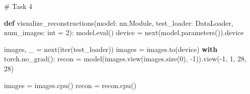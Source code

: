 \documentclass[
  letterpaper,
  DIV=11,
  numbers=noendperiod]{scrartcl}
\newenvironment{Shaded}{\begin{snugshade}}{\end{snugshade}}
\newcommand{\BuiltInTok}[1]{\textcolor[rgb]{0.00,0.23,0.31}{#1}}
\newcommand{\CommentTok}[1]{\textcolor[rgb]{0.37,0.37,0.37}{#1}}
\newcommand{\ControlFlowTok}[1]{\textcolor[rgb]{0.00,0.23,0.31}{\textbf{#1}}}
\newcommand{\DecValTok}[1]{\textcolor[rgb]{0.68,0.00,0.00}{#1}}
\newcommand{\KeywordTok}[1]{\textcolor[rgb]{0.00,0.23,0.31}{\textbf{#1}}}
\newcommand{\NormalTok}[1]{\textcolor[rgb]{0.00,0.23,0.31}{#1}}
\newcommand{\OperatorTok}[1]{\textcolor[rgb]{0.37,0.37,0.37}{#1}}
\begin{document}
\begin{Shaded}
\begin{Highlighting}[]
\CommentTok{\# Task 4}

\KeywordTok{def}\NormalTok{ visualize\_reconstructions(model: nn.Module, test\_loader: DataLoader, num\_images: }\BuiltInTok{int} \OperatorTok{=} \DecValTok{2}\NormalTok{):}
\NormalTok{    model.}\BuiltInTok{eval}\NormalTok{()}
\NormalTok{    device }\OperatorTok{=} \BuiltInTok{next}\NormalTok{(model.parameters()).device}

\NormalTok{    images, \_ }\OperatorTok{=} \BuiltInTok{next}\NormalTok{(}\BuiltInTok{iter}\NormalTok{(test\_loader))}
\NormalTok{    images }\OperatorTok{=}\NormalTok{ images.to(device)}
    \ControlFlowTok{with}\NormalTok{ torch.no\_grad():}
\NormalTok{        recon }\OperatorTok{=}\NormalTok{ model(images.view(images.size(}\DecValTok{0}\NormalTok{), }\OperatorTok{{-}}\DecValTok{1}\NormalTok{)).view(}\OperatorTok{{-}}\DecValTok{1}\NormalTok{, }\DecValTok{1}\NormalTok{, }\DecValTok{28}\NormalTok{, }\DecValTok{28}\NormalTok{)}

\NormalTok{    images }\OperatorTok{=}\NormalTok{ images.cpu()}
\NormalTok{    recon }\OperatorTok{=}\NormalTok{ recon.cpu()}


\end{Highlighting}
\end{Shaded}
\end{document}
